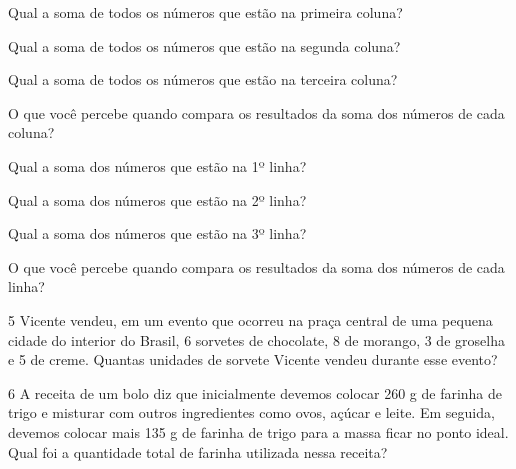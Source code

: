 \pagebreak
\begin{escolha}
\item Qual a soma de todos os números que estão na primeira coluna?


\item Qual a soma de todos os números que estão na segunda coluna?


\item Qual a soma de todos os números que estão na terceira coluna?


\item O que você percebe quando compara os resultados da soma dos números de cada coluna?


\item Qual a soma dos números que estão na 1º linha?


\item Qual a soma dos números que estão na 2º linha?


\item Qual a soma dos números que estão na 3º linha?


\item O que você percebe quando compara os resultados da soma dos números de cada linha?

\end{escolha}

\num{5} Vicente vendeu, em um evento que ocorreu na praça central de uma pequena
cidade do interior do Brasil, 6 sorvetes de chocolate, 8 de morango, 3
de groselha e 5 de creme. Quantas unidades de sorvete Vicente vendeu durante esse evento?


\num{6} A receita de um bolo diz que inicialmente devemos colocar 260 g de
farinha de trigo e misturar com outros ingredientes como ovos, açúcar e
leite. Em seguida, devemos colocar mais 135 g de farinha de trigo para a
massa ficar no ponto ideal. Qual foi a quantidade total de farinha
utilizada nessa receita?

